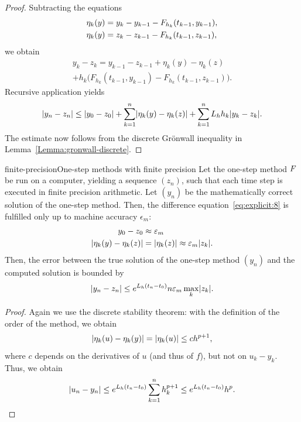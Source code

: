 

\begin{proof}
  Subtracting the equations
  \begin{align*}
    \eta_k(y) &= y_k-y_{k-1} - F_{h_k}(t_{k-1},y_{k-1}),
    \\
    \eta_k(y) &= z_k-z_{k-1} - F_{h_k}(t_{k-1},z_{k-1}),
  \end{align*}
  we obtain
  \begin{multline*}
    y_k-z_k = y_{k-1} - z_{k-1} + \eta_k(y) - \eta_k(z)
    \\
    + h_k \bigl(
      F_{h_k}(t_{k-1},y_{k-1})-F_{h_k}(t_{k-1},z_{k-1})
    \bigr)
    .
  \end{multline*}
  Recursive application yields
  \begin{gather*}
    \lvert y_n-z_n\rvert \le \lvert y_0-z_0\rvert
    + \sum_{k=1}^n \lvert\eta_k(y)-\eta_k(z)\rvert
    + \sum_{k=1}^n L_h h_{k} \lvert y_k-z_k\rvert.
  \end{gather*}
  The estimate now follows from the discrete Grönwall inequality in
  Lemma~\ref{Lemma:gronwall-discrete}.
\end{proof}

\begin{Corollary*}{finite-precision}{One-step methods with finite precision}
  Let the one-step method $F$ be run on a computer, yielding
  a sequence $(z_n)$, such that each time step is executed in finite
  precision arithmetic. Let $(y_n)$ be the mathematically correct
  solution of the one-step method. Then, the difference
  equation~\eqref{eq:explicit:8} is fulfilled only up to machine
  accuracy $\epsilon_m$:
  \begin{align*}
    y_0-z_0 &\approx \varepsilon_m \\
    \lvert\eta_k(y) - \eta_k(z)\rvert &= \lvert\eta_k(z)\rvert \approx \varepsilon_m \lvert z_k\rvert.
  \end{align*}
  Then, the error between the true solution of the one-step method
  $(y_n)$ and the computed solution is bounded by
  \begin{gather*}
    \lvert y_n-z_n\rvert \le e^{L_h(t_n-t_0)} n \varepsilon_m \max_k\lvert z_k\rvert.
  \end{gather*}
\end{Corollary*}



\begin{proof}
  Again we use the discrete stability theorem: with the definition of
  the order of the method, we obtain
  \begin{gather*}
    \lvert\eta_k(u)-\eta_k(y)\rvert = \lvert\eta_k(u)\rvert \le c h^{p+1},
  \end{gather*}
  where $c$ depends on the derivatives of $u$ (and thus of $f$), but
  not on $u_k-y_k$. Thus, we obtain
  \begin{gather*}
    \lvert u_n-y_n\rvert \le e^{L_h(t_n-t_0)}\sum_{k=1}^n h_k^{p+1}
    \le e^{L_h(t_n-t_0)} h^p.
  \end{gather*}
\end{proof}

